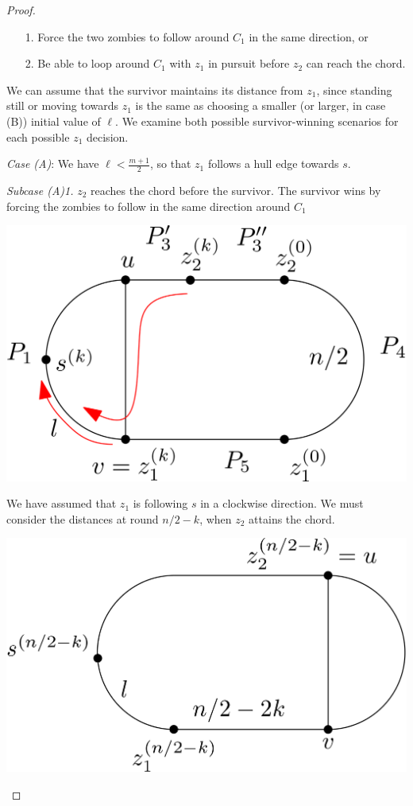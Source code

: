 \documentclass[letterpaper, 10pt]{article}
\begin{document}
\begin{proof}
\begin{enumerate}
\item[1.] Force the two zombies to follow around $C_1$ in the same direction, or
\item[2.] Be able to loop around $C_1$ with $z_1$ in pursuit before $z_2$ can reach the chord.
\end{enumerate}

We can assume that the survivor maintains its distance from $z_1$, since
standing still or moving towards $z_1$ is the same as choosing a smaller (or larger, in case (B))
initial value of $\ell$.
We examine both possible survivor-winning scenarios for each possible $z_1$ decision.

\emph{Case (A)}: We have $\ell < \frac{m+1}{2}$, so that $z_1$ follows a hull edge towards $s$.

\emph{Subcase (A)1.} $z_2$ reaches the chord before the survivor.
The survivor wins by forcing the zombies to follow in the same direction around $C_1$

\begin{center}
\includegraphics[scale=0.15]{diagramCaseA1_1}
\end{center}

We have assumed that $z_1$ is following $s$ in a clockwise direction. We must consider the distances at
round $n/2 - k$, when $z_2$ attains the chord.

\begin{center}
\includegraphics[scale=0.15]{diagramCaseA1_2}
\end{center}


\end{proof}
\end{document}
